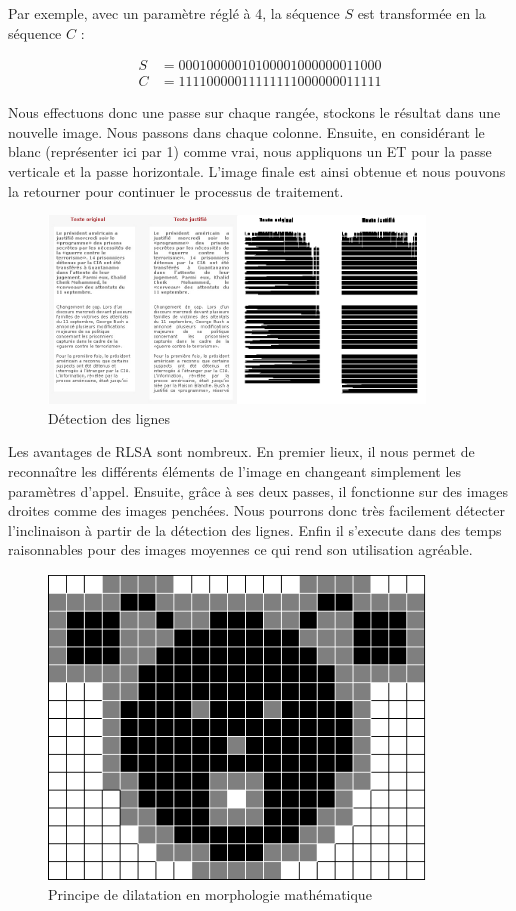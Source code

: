 \documentclass[11pt]{report}
\begin{document}
Par exemple, avec un paramètre réglé à 4, la séquence $S$ est transformée en la séquence $C$ :

\begin{align*}
S &= 00010000010100001000000011000\\
C &= 11110000011111111000000011111
\end{align*}

Nous effectuons donc une passe sur chaque rangée, stockons le résultat dans une nouvelle image. Nous passons dans chaque colonne. Ensuite, en considérant le blanc (représenter ici par 1) comme vrai, nous appliquons un ET pour la passe verticale et la passe horizontale. L'image finale est ainsi obtenue et nous pouvons la retourner pour continuer le processus de traitement.

\begin{figure}[htbp]
\centering
\includegraphics[width=10cm]{rlsa.png}
\caption{Détection des lignes}
\end{figure}

Les avantages de RLSA sont nombreux. En premier lieux, il nous permet de reconnaître les différents éléments de l'image en changeant simplement les paramètres d'appel. Ensuite, grâce à ses deux passes, il fonctionne sur des images droites comme des images penchées. Nous pourrons donc très facilement détecter l'inclinaison à partir de la détection des lignes. Enfin il s'execute dans des temps raisonnables pour des images moyennes ce qui rend son utilisation agréable.

\begin{figure}[htbp]
\centering
\includegraphics[width=10cm]{dilatation.png}
\caption{Principe de dilatation en morphologie mathématique}
\end{figure}
\end{document}
